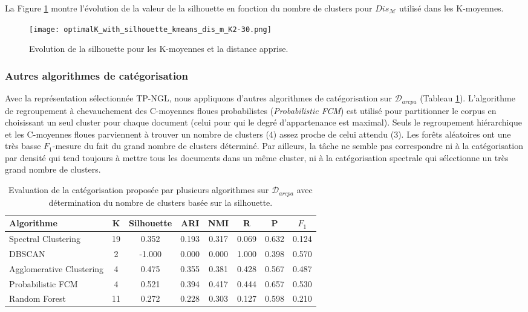 La Figure \ref{fig:similarite:optimalK_with_silhouette_kmeans_dis_m_K2-30} montre l'évolution de la valeur de la silhouette en fonction du nombre de clusters pour $Dis_\mathcal{M}$ utilisé dans les K-moyennes. 

\begin{figure}[!htb]
	\centering \texttt{[image: optimalK\_with\_silhouette\_kmeans\_dis\_m\_K2-30.png]} \hfil
	
	\caption{Evolution de la silhouette pour les K-moyennes et la distance apprise.}\label{fig:similarite:optimalK_with_silhouette_kmeans_dis_m_K2-30}
\end{figure}
 

\subsubsection{Autres algorithmes de catégorisation}
Avec la représentation sélectionnée TP-NGL, nous appliquons d'autres algorithmes de catégorisation sur $\mathcal{D}_{arcpa}$ (Tableau \ref{tab:similarite:validation-supervisee-optKbySilhouette-autres_algos}). L'algorithme de regroupement à chevauchement des C-moyennes floues probabilistes (\textit{Probabilistic FCM}) est utilisé pour partitionner le corpus en choisissant un seul cluster pour chaque document (celui pour qui le degré d'appartenance est maximal). Seuls le regroupement hiérarchique et les C-moyennes floues parviennent à trouver un nombre de clusters (4) assez proche de celui attendu (3). Les forêts aléatoires ont une très basse $F_1$-mesure du fait du grand nombre de clusters déterminé. Par ailleurs, la tâche ne semble pas correspondre ni à  la catégorisation par densité qui tend toujours à mettre tous les documents dans un même cluster, ni à la catégorisation spectrale qui sélectionne un très grand nombre de clusters. 
\begin{table}[!htb]
	\centering \footnotesize
	\begin{tabular}[pos]{|l|c|c|c|c|c|c|c|}
		\hline
		Algorithme& {K}& {Silhouette}& {ARI} & {NMI} & {R} & {P} & ${F_1}$ \\ \hline
		Spectral Clustering & 19 & 0.352 & 0.193 & 0.317 & 0.069 & 0.632 & 0.124 \\ \hline 
		DBSCAN & 2 & -1.000 & 0.000 & 0.000 & 1.000 & 0.398 & 0.570 \\ \hline 
		Agglomerative Clustering & 4 & 0.475 & 0.355 & 0.381 & 0.428 & 0.567 & 0.487 \\ \hline 
		Probabilistic FCM & 4 & 0.521 & 0.394 & 0.417 & 0.444 & 0.657 & 0.530 \\ \hline 
		Random Forest & 11 & 0.272 & 0.228 & 0.303 & 0.127 & 0.598 & 0.210 \\ \hline 
	\end{tabular}
	\caption{Evaluation de la catégorisation proposée par plusieurs algorithmes sur $\mathcal{D}_{arcpa}$ avec détermination du nombre de clusters basée sur la silhouette.} \label{tab:similarite:validation-supervisee-optKbySilhouette-autres_algos}
\end{table}

